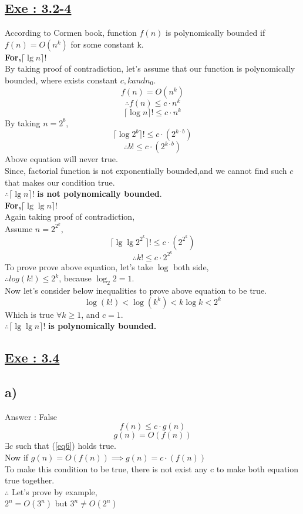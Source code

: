 \documentclass[a4paper, 11pt]{article}
\begin{document}
\subsection*{\underline{Exe : 3.2-4}}
According to Cormen book, function $f(n)$ is polynomically bounded if $f(n) = O(n^k)$ for some constant k.\\
\textbf{For,$ \lceil \lg n \rceil ! $}\\
By taking proof of contradiction, let's assume that our function is polynomically bounded, where exists constant $ c,k and n_{0}$.
$$f(n)=O(n^k)$$
$$\therefore f(n) \le c \cdot n^k$$
$$\lceil \log n \rceil ! \le c \cdot n^k$$
By taking $n=2^b$,
$$\lceil \log 2^b \rceil ! \le c \cdot (2^{k \cdot b})$$
$$\therefore b ! \le c \cdot (2^{k \cdot b})$$
Above equation will never true.\\
Since, factorial function is not exponentially bounded,and we cannot find such $c$ that makes our condition true.\\
$\therefore \lceil \lg n \rceil ! $ \textbf{ is not polynomically bounded}. \\
\textbf{For,$ \lceil \lg \lg n \rceil ! $}\\
Again taking proof of contradiction,\\
Assume $n=2^{2^k}$,
$$ \lceil \lg \lg 2^{2^k} \rceil ! \le c \cdot (2^{2^k}) $$
$$\therefore k! \le c \cdot 2^{2^k}$$ 
To prove prove above equation, let's take $\log$ both side,\\
$\therefore log(k!) \le 2^k$, because $\log_{2}2 =1$.\\
Now let's consider below inequalities to prove above equation to be true.
$$ \log(k!) < \log(k^k) < k\log k < 2^k $$
Which is true $\forall k \ge 1$, and $c=1$.\\
$\therefore \lceil \lg \lg n \rceil ! $ \textbf{is polynomically bounded.}

\subsection*{\underline{Exe : 3.4}}
\subsection*{a)}
Answer : False
\begin{equation}
\label{eq6}
f(n) \le c \cdot g(n)
\end{equation}
\begin{equation}
\label{eq7}
g(n) = O(f(n))
\end{equation}
$\exists c $ such that (\ref{eq6}) holds true.\\
Now if $g(n)=O(f(n)) \implies g(n) = c \cdot (f(n))$\\
To make this condition to be true, there is not exist any c to make both equation true together.\\
$\therefore$ Let's prove by example,\\
$2^n = O(3^n)$ but $3^n \ne O(2^n)$
\end{document}
